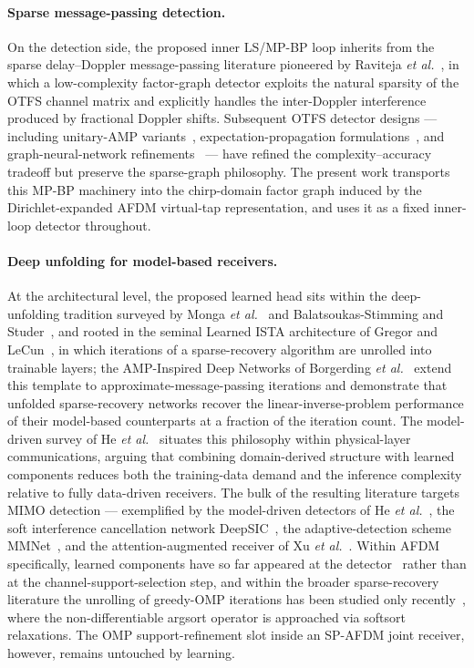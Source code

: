 \paragraph{Sparse message-passing detection.}
On the detection side, the proposed inner LS/MP-BP loop inherits from the
sparse delay--Doppler message-passing literature pioneered by Raviteja
\emph{et al.}~\cite{raviteja2018otfs}, in which a low-complexity
factor-graph detector exploits the natural sparsity of the OTFS channel
matrix and explicitly handles the inter-Doppler interference produced by
fractional Doppler shifts. Subsequent OTFS detector designs --- including
unitary-AMP variants~\cite{yuan2022uampotfs}, expectation-propagation
formulations~\cite{pu2024epotfs}, and graph-neural-network
refinements~\cite{zhuang2024amgnnotfs} --- have refined the
complexity--accuracy tradeoff but preserve the sparse-graph philosophy. The
present work transports this MP-BP machinery into the chirp-domain factor
graph induced by the Dirichlet-expanded AFDM virtual-tap representation,
and uses it as a fixed inner-loop detector throughout.

\paragraph{Deep unfolding for model-based receivers.}
At the architectural level, the proposed learned head sits within the
deep-unfolding tradition surveyed by Monga \emph{et
al.}~\cite{monga2021unrolling} and Balatsoukas-Stimming and
Studer~\cite{balatsoukasstimming2019deepunfolding}, and rooted in the
seminal Learned ISTA architecture of Gregor and
LeCun~\cite{gregor2010lista}, in which iterations of a sparse-recovery
algorithm are unrolled into trainable layers; the AMP-Inspired Deep
Networks of Borgerding \emph{et al.}~\cite{borgerding2017amp} extend this
template to approximate-message-passing iterations and demonstrate that
unfolded sparse-recovery networks recover the linear-inverse-problem
performance of their model-based counterparts at a fraction of the
iteration count. The model-driven survey of He
\emph{et al.}~\cite{he2019modeldrivensurvey} situates this philosophy
within physical-layer communications, arguing that combining domain-derived
structure with learned components reduces both the training-data demand and
the inference complexity relative to fully data-driven receivers. The bulk
of the resulting literature targets MIMO detection --- exemplified by the
model-driven detectors of He \emph{et
al.}~\cite{he2020modeldrivenmimo}, the soft interference
cancellation network DeepSIC~\cite{shlezinger2021deepsic}, the
adaptive-detection scheme MMNet~\cite{khani2020mmnet}, and the
attention-augmented receiver of Xu \emph{et
al.}~\cite{xu2024detecttolearn}. Within AFDM specifically, learned
components have so far appeared at the detector~\cite{afdm2025jointcesd}
rather than at the channel-support-selection step, and within the broader
sparse-recovery literature the unrolling of greedy-OMP iterations has been
studied only recently~\cite{mohammadtaheri2025deepgreedyunfolding}, where
the non-differentiable argsort operator is approached via softsort
relaxations. The OMP support-refinement slot inside an SP-AFDM joint
receiver, however, remains untouched by learning.

